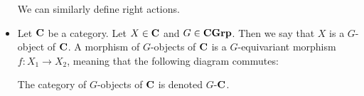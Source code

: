\begin{itemize}
	We can similarly define right actions.
    \item Let $\mathbf{C}$ be a category.
	Let $X\in \mathbf{C}$ and $G\in \mathbf{C}\mathbf{Grp}$.
	Then we say that $X$ is a $G$-object of $\mathbf{C}$.
	A morphism of $G$-objects of $\mathbf{C}$ is a $G$-equivariant morphism $f\colon X_{1}\to X_{2}$, meaning that the following diagram commutes:
	\begin{center}
	\end{center}
	The category of $G$-objects of $\mathbf{C}$ is denoted $G$-$\mathbf{C}$.
\end{itemize}
